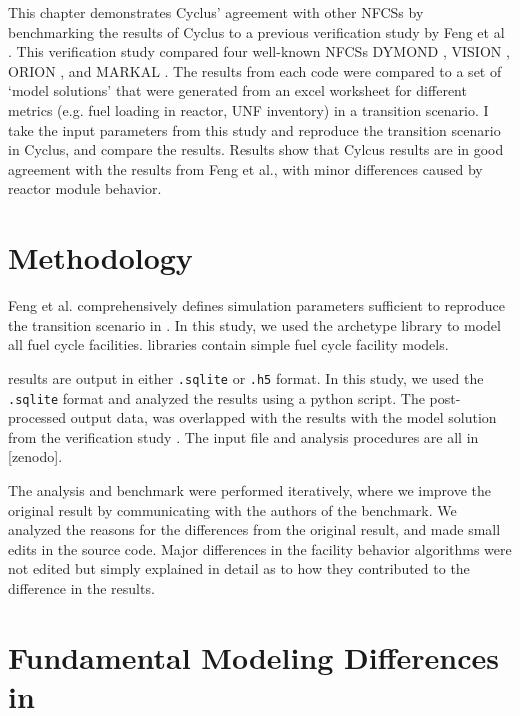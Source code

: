 This chapter demonstrates Cyclus' agreement with other
\glspl{NFCS} by benchmarking the results of Cyclus to
a previous verification study by Feng et al \cite{feng_standardized_2016}.
This verification study compared four well-known \glspl{NFCS}
DYMOND \cite{yacout_modeling_2005},
VISION \cite{jacobson_verifiable_2010},
ORION \cite{gregg_analysis_2012}, and
MARKAL \cite{shay_epa_2006}. The results from each code were compared to a
set of `model solutions' that were generated from an excel worksheet 
for different metrics (e.g. fuel loading in reactor, \gls{UNF} inventory)
in a transition scenario. I take the input parameters from this study
and reproduce the transition scenario in Cyclus, and compare the results.
Results show that Cylcus results are in good agreement with the results
from Feng et al., with minor differences caused by reactor module behavior.

\section{Methodology}

Feng et al. comprehensively defines simulation parameters
sufficient to reproduce the transition scenario in \Cyclus.
In this study, we used the \Cycamore \cite{huff_fundamental_2016}
archetype library to model
all fuel cycle facilities. \Cycamore libraries contain
simple fuel cycle facility models. 

\Cyclus results are output in either \texttt{.sqlite} or
\texttt{.h5} format. In this study, we used the
\texttt{.sqlite} format and analyzed the results
using a python script. The post-processed
output data, was overlapped with the results with the
model solution from the verification study \cite{feng_standardized_2016}.
The input file and analysis procedures are all in [zenodo].

The analysis and benchmark were performed iteratively,
where we improve the original result by communicating
with the authors of the benchmark. 
We analyzed the reasons for the differences from the original
result, and made small edits in the source code.
Major differences in the facility behavior algorithms were not edited but
simply explained in detail as to how they contributed
to the difference in the results.

\section{Fundamental Modeling Differences in \Cyclus}

